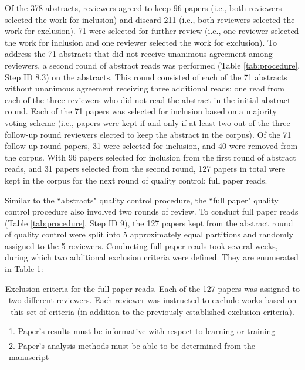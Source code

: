 \documentclass[manuscript,screen,review]{acmart}
\begin{document}
Of the 378 abstracts, reviewers agreed to keep 96 papers (i.e., both reviewers selected the work for inclusion) and discard 211 (i.e., both reviewers selected the work for exclusion). 71 were selected for further review (i.e., one reviewer selected the work for inclusion and one reviewer selected the work for exclusion). To address the 71 abstracts that did not receive unanimous agreement among reviewers, a second round of abstract reads was performed (Table \ref{tab:procedure}, Step ID 8.3) on the abstracts. This round consisted of each of the 71 abstracts without unanimous agreement receiving three additional reads: one read from each of the three reviewers who did not read the abstract in the initial abstract round. Each of the 71 papers was selected for inclusion based on a majority voting scheme (i.e., papers were kept if and only if at least two out of the three follow-up round reviewers elected to keep the abstract in the corpus). Of the 71 follow-up round papers, 31 were selected for inclusion, and 40 were removed from the corpus. With 96 papers selected for inclusion from the first round of abstract reads, and 31 papers selected from the second round, 127 papers in total were kept in the corpus for the next round of quality control: full paper reads.

Similar to the ``abstracts" quality control procedure, the ``full paper" quality control procedure also involved two rounds of review. To conduct full paper reads (Table \ref{tab:procedure}, Step ID 9), the 127 papers kept from the abstract round of quality control were split into 5 approximately equal partitions and randomly assigned to the 5 reviewers. Conducting full paper reads took several weeks, during which two additional exclusion criteria were defined. They are enumerated in Table \ref{tab:full_paper_exclusion_criteria}:

\begin{table}[htbp]
    \renewcommand{\arraystretch}{1.3}%
    \centering
    \caption{Exclusion criteria for the full paper reads. Each of the 127 papers was assigned to two different reviewers. Each reviewer was instructed to exclude works based on this set of criteria (in addition to the previously established exclusion criteria).}
    \begin{tabularx}{\linewidth}{l@{\hskip .25in}}
    
        \midrule
        
        1. Paper's results must be informative with respect to learning or training \\
        2. Paper's analysis methods must be able to be determined from the manuscript\\

        \bottomrule
    \end{tabularx}
    \label{tab:full_paper_exclusion_criteria}
\end{table}
\end{document}
